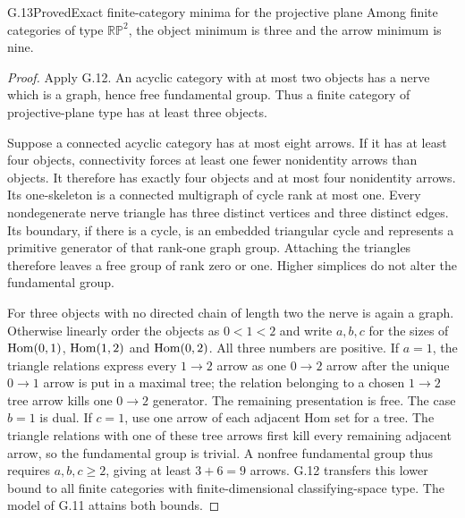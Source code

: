 \begin{claim}{G.13}{Proved}{Exact finite-category minima for the projective plane}
Among finite categories of type $\mathbb{RP}^2$, the object minimum is three and the arrow minimum is nine.
\end{claim}
\begin{proof}
Apply G.12. An acyclic category with at most two objects has a nerve which is a graph, hence free fundamental group. Thus a finite category of projective-plane type has at least three objects.

Suppose a connected acyclic category has at most eight arrows. If it has at least four objects, connectivity forces at least one fewer nonidentity arrows than objects. It therefore has exactly four objects and at most four nonidentity arrows. Its one-skeleton is a connected multigraph of cycle rank at most one. Every nondegenerate nerve triangle has three distinct vertices and three distinct edges. Its boundary, if there is a cycle, is an embedded triangular cycle and represents a primitive generator of that rank-one graph group. Attaching the triangles therefore leaves a free group of rank zero or one. Higher simplices do not alter the fundamental group.

For three objects with no directed chain of length two the nerve is again a graph. Otherwise linearly order the objects as $0<1<2$ and write $a,b,c$ for the sizes of $\operatorname{Hom}(0,1)$, $\operatorname{Hom}(1,2)$ and $\operatorname{Hom}(0,2)$. All three numbers are positive. If $a=1$, the triangle relations express every $1\to2$ arrow as one $0\to2$ arrow after the unique $0\to1$ arrow is put in a maximal tree; the relation belonging to a chosen $1\to2$ tree arrow kills one $0\to2$ generator. The remaining presentation is free. The case $b=1$ is dual. If $c=1$, use one arrow of each adjacent Hom set for a tree. The triangle relations with one of these tree arrows first kill every remaining adjacent arrow, so the fundamental group is trivial. A nonfree fundamental group thus requires $a,b,c\geq2$, giving at least $3+6=9$ arrows. G.12 transfers this lower bound to all finite categories with finite-dimensional classifying-space type. The model of G.11 attains both bounds.
\end{proof}

